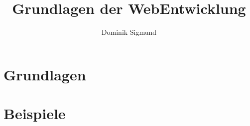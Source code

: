\documentclass[12pt]{book}
\author{Dominik Sigmund}
\title{Grundlagen der WebEntwicklung}
\begin{document}
\maketitle


\tableofcontents

\part{Grundlagen}












\part{Beispiele}
\end{document}
